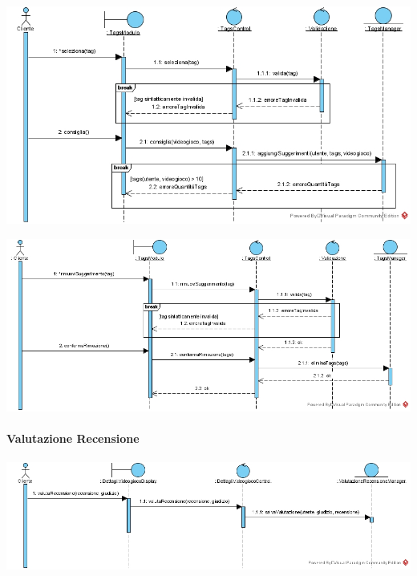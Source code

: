 \newpage
\begin{center}
\includegraphics[width=\textwidth,height=\textheight,keepaspectratio]{Figure/SequenceDiagrams/SuggerimentoTagsInner.jpg}
\end{center}

\begin{center}
\includegraphics[width=\textwidth,height=\textheight,keepaspectratio]{Figure/SequenceDiagrams/SuggerimentoTagsRemove.jpg}
\end{center}

\newpage
\paragraph{Valutazione Recensione}
\begin{center}
\includegraphics[width=\textwidth,height=\textheight,keepaspectratio]{Figure/SequenceDiagrams/ValutazioneRecensione.jpg}
\end{center}

